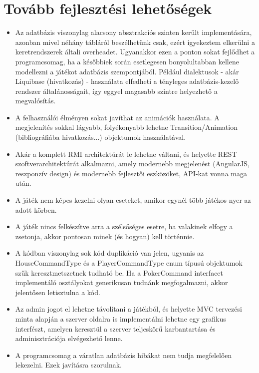 \section{Tovább fejlesztési lehetőségek}
\begin{itemize}
\item Az adatbázis viszonylag alacsony absztrakciós szinten került implementására, azonban mivel néhány tábláról beszélhetünk csak, ezért igyekeztem elkerülni a keretrendszerek általi overheadet. Ugyanakkor ezen a ponton sokat fejlődhet a programcsomag, ha a későbbiek során esetlegesen bonyolultabban kellene modellezni a játékot adatbázis szempontjából. Például dialektusok - akár Liquibase (hivatkozás) - használata elfedheti a tényleges adatbázis-kezelő rendszer általánosságait, így eggyel magasabb szintre helyezhető a megvalósítás.
\item A felhasználói élményen sokat javíthat az animációk használata. A megjelenítés sokkal lágyabb, folyékonyabb lehetne Transition/Animation (bibliográfiába hivatkozás...) objektumok használatával.
\item Akár a komplett RMI architektúrát le lehetne váltani, és helyette REST szoftverarchitektúrát alkalmazni, amely modernebb megjelenést (AngularJS, reszponzív design) és modernebb fejlesztői eszközöket, API-kat vonna maga után.
\item A játék nem képes kezelni olyan eseteket, amikor egynél több játékos nyer az adott körben.
\item A játék nincs felkészítve arra a szélsőséges esetre, ha valakinek elfogy a zsetonja, akkor pontosan minek (és hogyan) kell történnie.
\item A kódban viszonylag sok kód duplikáció van jelen, ugyanis az HouseCommandType és a PlayerCommandType enum típusú objektumok szűk keresztmetszetnek tudható be. Ha a PokerCommand interfacet implementáló osztályokat generikusan tudnánk megfogalmazni, akkor jelentősen letisztulna a kód.
\item Az admin jogot el lehetne távolítani a játékból, és helyette MVC tervezési minta alapján a szerver oldalra is implementálni lehetne egy grafikus interfészt, amelyen keresztül a szerver teljeskörű karbantartása és adminisztrációja elvégezhető lenne.
\item A programcsomag a váratlan adatbázis hibákat nem tudja megfelelően lekezelni. Ezek javításra szorulnak.
\end{itemize}


\clearpage
